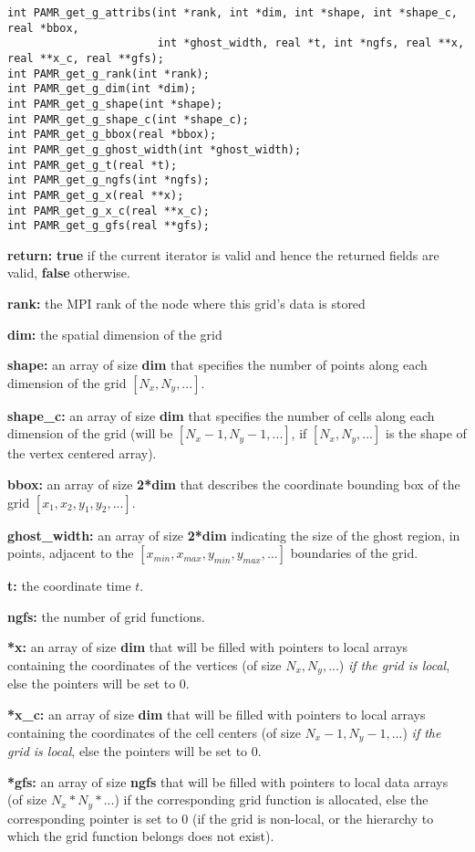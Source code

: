 \documentclass[aps,amssymb,unsortedaddress,nofootinbib]{revtex4}
\def\lsep{\itemsep 0.05in}
\begin{document}
\begin{verbatim}
int PAMR_get_g_attribs(int *rank, int *dim, int *shape, int *shape_c, real *bbox,
                       int *ghost_width, real *t, int *ngfs, real **x, real **x_c, real **gfs);
int PAMR_get_g_rank(int *rank);
int PAMR_get_g_dim(int *dim);
int PAMR_get_g_shape(int *shape);
int PAMR_get_g_shape_c(int *shape_c);
int PAMR_get_g_bbox(real *bbox);
int PAMR_get_g_ghost_width(int *ghost_width);
int PAMR_get_g_t(real *t);
int PAMR_get_g_ngfs(int *ngfs);
int PAMR_get_g_x(real **x);
int PAMR_get_g_x_c(real **x_c);
int PAMR_get_g_gfs(real **gfs);
\end{verbatim}
\begin{list}{}{\lsep}
\item {\bf return:} {\bf true} if the current iterator is valid and hence the returned
                               fields are valid, {\bf false} otherwise.
\item {\bf *rank:} the MPI rank of the node where this grid's data is stored
\item {\bf *dim:} the spatial dimension of the grid
\item {\bf *shape:} an array of size {\bf dim} that specifies the number of points
                    along each dimension of the grid $[N_x,N_y,...]$.
\item {\bf *shape\_c:} an array of size {\bf dim} that specifies the number of cells
                    along each dimension of the grid (will be $[N_x-1,N_y-1,...]$, if 
                    $[N_x,N_y,...]$ is the shape of the vertex centered array).
\item {\bf *bbox:} an array of size {\bf 2*dim} that describes the coordinate bounding
                   box of the grid $[x_1,x_2,y_1,y_2,...]$.
\item {\bf *ghost\_width:} an array of size {\bf 2*dim} indicating the size of the
                   ghost region, in points, adjacent to the 
                   $[x_{min},x_{max},y_{min},y_{max},...]$ boundaries of the grid.
\item {\bf *t:} the coordinate time $t$.
\item {\bf *ngfs:} the number of grid functions.
\item {\bf **x:} an array of size {\bf dim} that will be filled with pointers
                 to local arrays containing the coordinates of the vertices (of size $N_x, N_y, ...$)
                 {\em if the grid is local}, else the pointers will be set to 0.
\item {\bf **x\_c:} an array of size {\bf dim} that will be filled with pointers
                 to local arrays containing the coordinates of the cell centers (of size $N_x-1, N_y-1, ...$)
                 {\em if the grid is local}, else the pointers will be set to 0.
\item {\bf **gfs:} an array of size {\bf ngfs} that will be filled with pointers
                 to local data arrays (of size $N_x*N_y*...$) if the 
                 corresponding grid function is allocated,
                 else the corresponding pointer is set to 0 (if the grid is
                 non-local, or the hierarchy to which the grid function belongs
                 does not exist).
\end{list}
\end{document}
